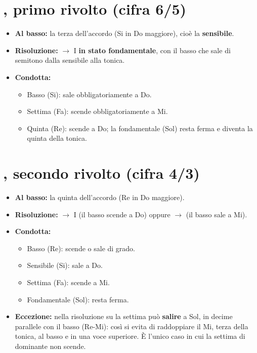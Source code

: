 \section{, primo rivolto (cifra 6/5)}
\label{subsec:v65}
\begin{itemize}
    \item \textbf{Al basso:} la terza dell'accordo (Si in Do maggiore), cioè la \textbf{sensibile}.
    \item \textbf{Risoluzione:} $\rightarrow$ I \textbf{in stato fondamentale}, con il basso che sale di semitono dalla sensibile alla tonica.
    \item \textbf{Condotta:}
    \begin{itemize}
        \item Basso (Si): sale obbligatoriamente a Do.
        \item Settima (Fa): scende obbligatoriamente a Mi.
        \item Quinta (Re): scende a Do; la fondamentale (Sol) resta ferma e diventa la quinta della tonica.
    \end{itemize}
\end{itemize}

\begin{esempio}
	\label{ex:v65}
\end{esempio}

\section{, secondo rivolto (cifra 4/3)}
\label{subsec:v43}
\begin{itemize}
    \item \textbf{Al basso:} la quinta dell'accordo (Re in Do maggiore).
    \item \textbf{Risoluzione:} $\rightarrow$ I (il basso scende a Do) oppure $\rightarrow$  (il basso sale a Mi).
    \item \textbf{Condotta:}
    \begin{itemize}
        \item Basso (Re): scende o sale di grado.
        \item Sensibile (Si): sale a Do.
        \item Settima (Fa): scende a Mi.
        \item Fondamentale (Sol): resta ferma.
    \end{itemize}
    \item \textbf{Eccezione:} nella risoluzione su  la settima può \textbf{salire} a Sol, in decime parallele con il basso (Re-Mi): così si evita di raddoppiare il Mi, terza della tonica, al basso e in una voce superiore. È l'unico caso in cui la settima di dominante non scende.
\end{itemize}


